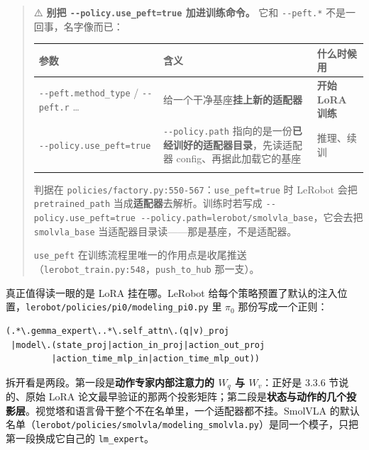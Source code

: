 \documentclass[
  chinese,
]{ctexart}
\begin{document}
\begin{quote}
⚠️ \textbf{别把 \texttt{-\/-policy.use\_peft=true} 加进训练命令。} 它和
\texttt{-\/-peft.*} 不是一回事，名字像而已：

\begin{center}
\begin{tabular}{@{}>{\raggedright\arraybackslash}p{} >{\raggedright\arraybackslash}p{} >{\raggedright\arraybackslash}p{}@{}}
\toprule\noalign{}
参数 & 含义 & 什么时候用 \\
\midrule\noalign{}
\texttt{-\/-peft.method\_\allowbreak type} / \texttt{-\/-peft.r} \ldots{} & 给一个干净基座\textbf{挂上新的适配器} & \textbf{开始 LoRA 训练} \\
\texttt{-\/-policy.use\_\allowbreak peft=true} & \texttt{-\/-policy.path} 指向的是一份\textbf{已经训好的适配器目录}，先读适配器 config、再据此加载它的基座 & 推理、续训 \\
\bottomrule\noalign{}
\end{tabular}
\end{center}

判据在 \texttt{policies/factory.py:550-567}：\texttt{use\_peft=true} 时
LeRobot 会把 \texttt{pretrained\_path}
当成\textbf{适配器}去解析。训练时若写成
\texttt{-\/-policy.use\_peft=true\ -\/-policy.path=lerobot/smolvla\_base}，它会去把
\texttt{smolvla\_base} 当适配器目录读------那是基座，不是适配器。

\texttt{use\_peft}
在训练流程里唯一的作用点是收尾推送（\texttt{lerobot\_train.py:548}，\texttt{push\_to\_hub}
那一支）。
\end{quote}

真正值得读一眼的是 LoRA 挂在哪。LeRobot
给每个策略预置了默认的注入位置，\texttt{lerobot/policies/pi0/modeling\_pi0.py}
里 \(\pi_0\) 那份写成一个正则：

\begin{verbatim}
(.*\.gemma_expert\..*\.self_attn\.(q|v)_proj
 |model\.(state_proj|action_in_proj|action_out_proj
         |action_time_mlp_in|action_time_mlp_out))
\end{verbatim}

拆开看是两段。第一段是\textbf{动作专家内部注意力的 \(W_q\) 与
\(W_v\)}：正好是 3.3.6 节说的、原始 LoRA
论文最早验证的那两个投影矩阵；第二段是\textbf{状态与动作的几个投影层}。视觉塔和语言骨干整个不在名单里，一个适配器都不挂。SmolVLA
的默认名单（\texttt{lerobot/policies/smolvla/modeling\_smolvla.py}）是同一个模子，只把第一段换成它自己的
\texttt{lm\_expert}。
\end{document}

